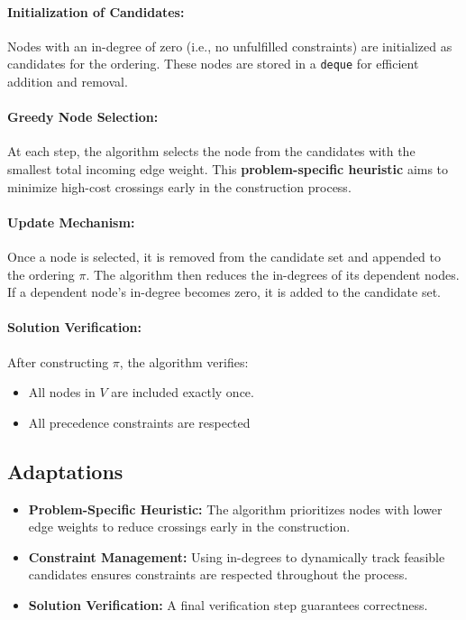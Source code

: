 \documentclass{article}
\begin{document}
\paragraph{Initialization of Candidates:}
Nodes with an in-degree of zero (i.e., no unfulfilled constraints) are initialized as candidates for the ordering. These nodes are stored in a \texttt{deque} for efficient addition and removal.

\paragraph{Greedy Node Selection:}
At each step, the algorithm selects the node from the candidates with the smallest total incoming edge weight. This \textbf{problem-specific heuristic} aims to minimize high-cost crossings early in the construction process.

\paragraph{Update Mechanism:}
Once a node is selected, it is removed from the candidate set and appended to the ordering \( \pi \). The algorithm then reduces the in-degrees of its dependent nodes. If a dependent node's in-degree becomes zero, it is added to the candidate set.

\paragraph{Solution Verification:}
After constructing \( \pi \), the algorithm verifies:
\begin{itemize}
    \item All nodes in \( V \) are included exactly once.
    \item All precedence constraints are respected
\end{itemize}

\subsection*{Adaptations}
\begin{itemize}
    \item \textbf{Problem-Specific Heuristic:} The algorithm prioritizes nodes with lower edge weights to reduce crossings early in the construction.
    \item \textbf{Constraint Management:} Using in-degrees to dynamically track feasible candidates ensures constraints are respected throughout the process.
    \item \textbf{Solution Verification:} A final verification step guarantees correctness.
\end{itemize}
\end{document}
